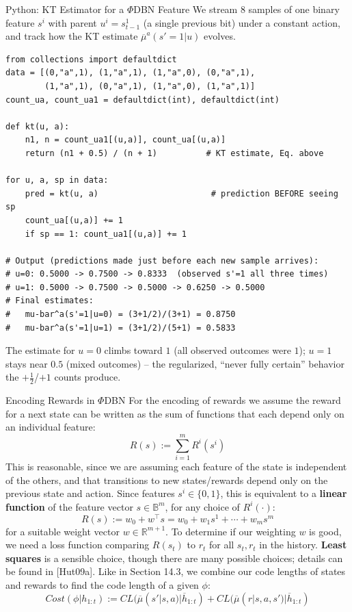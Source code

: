 \documentclass[aspectratio=169,10pt]{beamer}
\newcommand{\R}{\mathbb{R}}
\newcommand{\B}{\mathbb{B}}
\newcommand{\CL}{\mathit{CL}}
\begin{document}
\begin{frame}[fragile]{Python: KT Estimator for a $\Phi$DBN Feature}
  We stream $8$ samples of one binary feature $s^i$ with parent
  $u^i=s^1_{t-1}$ (a single previous bit) under a constant action, and
  track how the KT estimate $\overline\mu^a(s'=1|u)$ evolves.
  \begin{lstlisting}[style=pycode]
from collections import defaultdict
data = [(0,"a",1), (1,"a",1), (1,"a",0), (0,"a",1),
        (1,"a",1), (0,"a",1), (1,"a",0), (1,"a",1)]
count_ua, count_ua1 = defaultdict(int), defaultdict(int)

def kt(u, a):
    n1, n = count_ua1[(u,a)], count_ua[(u,a)]
    return (n1 + 0.5) / (n + 1)          # KT estimate, Eq. above

for u, a, sp in data:
    pred = kt(u, a)                       # prediction BEFORE seeing sp
    count_ua[(u,a)] += 1
    if sp == 1: count_ua1[(u,a)] += 1

# Output (predictions made just before each new sample arrives):
# u=0: 0.5000 -> 0.7500 -> 0.8333  (observed s'=1 all three times)
# u=1: 0.5000 -> 0.7500 -> 0.5000 -> 0.6250 -> 0.5000
# Final estimates:
#   mu-bar^a(s'=1|u=0) = (3+1/2)/(3+1) = 0.8750
#   mu-bar^a(s'=1|u=1) = (3+1/2)/(5+1) = 0.5833
  \end{lstlisting}
  The estimate for $u=0$ climbs toward $1$ (all observed outcomes were
  $1$); $u=1$ stays near $0.5$ (mixed outcomes) -- the regularized,
  ``never fully certain'' behavior the $+\tfrac12$/$+1$ counts produce.
\end{frame}

\begin{frame}{Encoding Rewards in $\Phi$DBN}
  For the encoding of rewards we assume the reward for a next state can be
  written as the sum of functions that each depend only on an individual
  feature:
  \[
    R(s) := \sum_{i=1}^m R^i(s^i)
  \]
  This is reasonable, since we are assuming each feature of the state is
  independent of the others, and that transitions to new states/rewards
  depend only on the previous state and action. Since features
  $s^i\in\{0,1\}$, this is equivalent to a \textbf{linear function} of the
  feature vector $s\in\B^m$, for any choice of $R^i(\cdot)$:
  \[
    R(s) := w_0 + w^\top s = w_0 + w_1 s^1 + \cdots + w_m s^m
  \]
  for a suitable weight vector $w\in\R^{m+1}$. To determine if our
  weighting $w$ is good, we need a loss function comparing $R(s_t)$ to
  $r_t$ for all $s_t,r_t$ in the history. \textbf{Least squares} is a
  sensible choice, though there are many possible choices; details can be
  found in [Hut09a]. Like in Section 14.3, we combine our code lengths of
  states and rewards to find the code length of a given $\phi$:
  \[
    \mathit{Cost}(\phi|h_{1:t}) := \CL(\overline\mu(s'|s,a)|\overline h_{1:t}) + \CL(\overline\mu(r|s,a,s')|\overline h_{1:t})
  \]
\end{frame}
\end{document}

